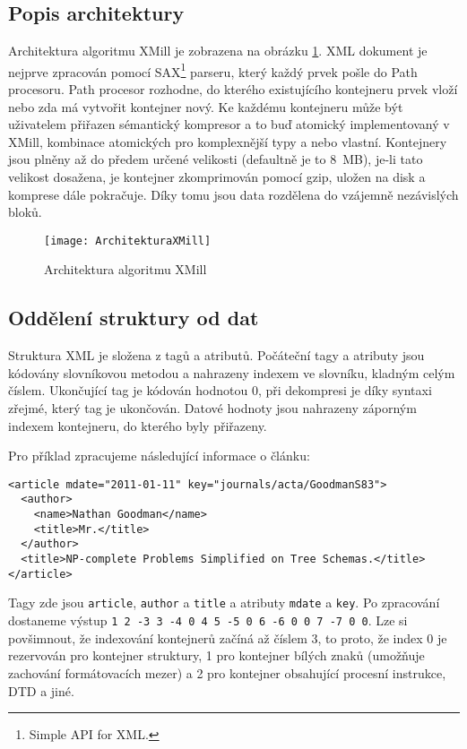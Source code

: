 \subsection{Popis architektury}
Architektura algoritmu XMill je zobrazena na obrázku \ref{architekturaXMill}. XML dokument je nejprve zpracován pomocí SAX\footnote{Simple API for XML.} parseru, který každý prvek pošle do Path procesoru. Path procesor rozhodne, do kterého existujícího kontejneru prvek vloží nebo zda má vytvořit kontejner nový. Ke každému kontejneru může být uživatelem přiřazen sémantický kompresor a to buď atomický implementovaný v XMill, kombinace atomických pro komplexnější typy a nebo vlastní. Kontejnery jsou plněny až do předem určené velikosti (defaultně je to 8~MB), je-li tato velikost dosažena, je kontejner zkomprimován pomocí gzip, uložen na disk a komprese dále pokračuje. Díky tomu jsou data rozdělena do vzájemně nezávislých bloků.

\begin{figure}[!htb]
\centering
\texttt{[image: ArchitekturaXMill]}
\caption{Architektura algoritmu XMill \cite{xmill}}
\label{architekturaXMill}
\end{figure}

\subsection{Oddělení struktury od dat}
\label{xmillOddeleniStruktury}
Struktura XML je složena z tagů a atributů. Počáteční tagy a atributy jsou kódovány slovníkovou metodou a nahrazeny indexem ve slovníku, kladným celým číslem. Ukončující tag je kódován hodnotou 0, při dekompresi je díky syntaxi zřejmé, který tag je ukončován. Datové hodnoty jsou nahrazeny záporným indexem kontejneru, do kterého byly přiřazeny. \cite{xmill}

Pro příklad zpracujeme následující informace o článku:

\begin{verbatim}
<article mdate="2011-01-11" key="journals/acta/GoodmanS83">
  <author>
    <name>Nathan Goodman</name>
    <title>Mr.</title>
  </author>
  <title>NP-complete Problems Simplified on Tree Schemas.</title>
</article>
\end{verbatim}

Tagy zde jsou \texttt{article}, \texttt{author} a \texttt{title} a atributy \texttt{mdate} a \texttt{key}. Po zpracování dostaneme výstup \texttt{1 2 -3 3 -4 0 4 5 -5 0 6 -6 0 0 7 -7 0 0}. Lze si povšimnout, že indexování kontejnerů začíná až číslem 3, to proto, že index 0 je rezervován pro kontejner struktury, 1 pro kontejner bílých znaků (umožňuje zachování formátovacích mezer) a 2 pro kontejner obsahující procesní instrukce, DTD a jiné.

